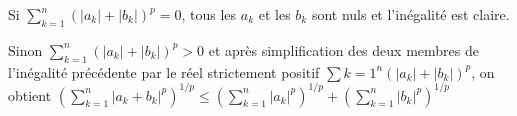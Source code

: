 {\begin{enumerate}
{Si  $\sum_{k=1}^{n}(|a_k|+|b_k|)^p = 0$, tous les $a_k$ et les $b_k$ sont nuls et l'inégalité est claire.

Sinon $\sum_{k=1}^{n}(|a_k|+|b_k|)^p > 0$ et après simplification des deux membres de l'inégalité précédente par le réel strictement positif $\sum{k=1}^{n}(|a_k|+|b_k|)^p$,  on obtient $\left(\sum_{k=1}^{n}|a_k+b_k|^p\right)^{1/p}\leqslant\left(\sum_{k=1}^{n}|a_k|^p\right)^{1/p}+\left(\sum_{k=1}^{n}|b_k|^p\right)^{1/p}$

\begin{center}
\end{center}}
\end{enumerate}
}